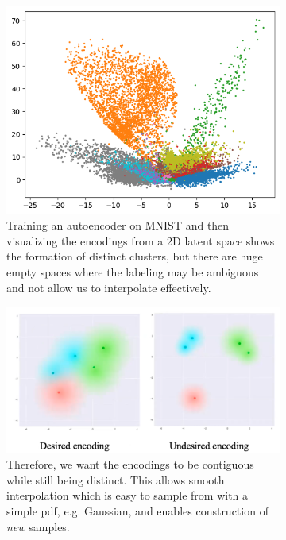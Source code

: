   \begin{figure}[H]
    \centering
    \begin{subfigure}[b]{0.48\textwidth}
      \centering
      \includegraphics[scale=0.36]{img/08_VAE/mnist_latent.png}
      \caption{Training an autoencoder on MNIST and then visualizing the encodings from a 2D latent space shows the formation of distinct clusters, but there are huge empty spaces where the labeling may be ambiguous and not allow us to interpolate effectively. }
      \label{fig:mnist_latent}
    \end{subfigure}
    \hfill 
    \begin{subfigure}[b]{0.48\textwidth}
      \centering
      \includegraphics[scale=0.22]{img/08_VAE/contiguous_encoding.png}
      \caption{ Therefore, we want the encodings to be contiguous while still being distinct. This allows smooth interpolation which is easy to sample from with a simple pdf, e.g. Gaussian, and enables construction of \textit{new} samples. } 
      \label{fig:contiguous_encoding}
    \end{subfigure}
    \caption{}
    \label{fig:motivation_vae}
  \end{figure}

